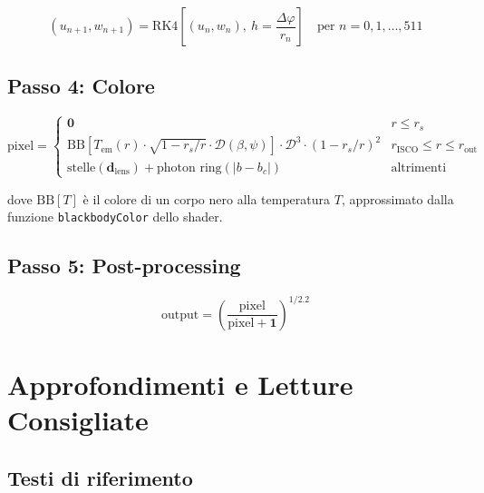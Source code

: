 \documentclass[12pt, a4paper, twoside]{article}
\theoremstyle{definition}
\newcommand{\RS}{r_{\!s}}          %
\newcommand{\bc}{b_{\!c}}          %
\begin{document}
\begin{equation}
  (u_{n+1}, w_{n+1}) = \text{RK4}\!\left[(u_n, w_n),\ h = \frac{\Delta\varphi}{r_n}\right]
  \quad \text{per } n = 0, 1, \dots, 511
\end{equation}

\subsection*{Passo 4: Colore}

\[
  \text{pixel} = \begin{cases}
    \mathbf{0}
      & r \leq \RS \\[4pt]
    \text{BB}\!\left[
      T_{\text{em}}(r) \cdot \sqrt{1-\RS/r} \cdot \mathcal{D}(\beta, \psi)
    \right] \cdot \mathcal{D}^3 \cdot (1-\RS/r)^2
      & r_{\text{ISCO}} \leq r \leq r_{\text{out}} \\[4pt]
    \text{stelle}(\mathbf{d}_{\text{lens}})
      + \text{photon ring}(|b - \bc|)
      & \text{altrimenti}
  \end{cases}
\]

dove $\text{BB}[T]$ è il colore di un corpo nero alla temperatura $T$,
approssimato dalla funzione \texttt{blackbodyColor} dello shader.

\subsection*{Passo 5: Post-processing}

\begin{equation}
  \text{output} = \left(\frac{\text{pixel}}{\text{pixel} + \mathbf{1}}\right)^{1/2.2}
\end{equation}

\newpage

\section{Approfondimenti e Letture Consigliate}

\subsection{Testi di riferimento}
\end{document}
